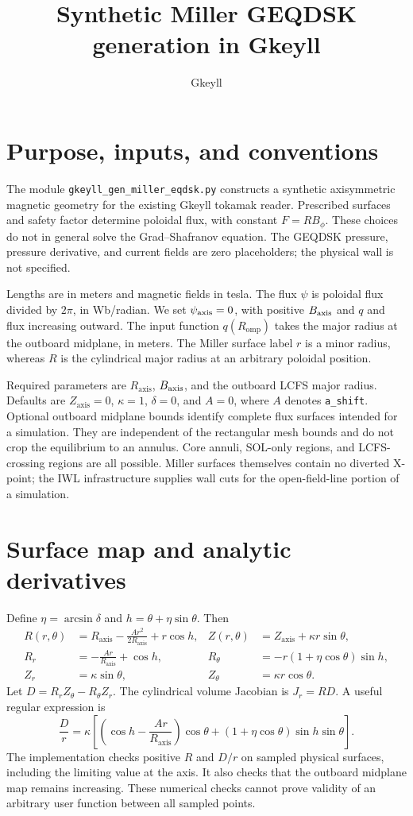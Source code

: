 \documentclass[11pt]{article}
\title{Synthetic Miller GEQDSK generation in Gkeyll}
\author{Gkeyll}
\date{}
\newcommand{\Ra}{R_{\mathrm{axis}}}
\newcommand{\Za}{Z_{\mathrm{axis}}}
\newcommand{\Romp}{R_{\mathrm{omp}}}
\begin{document}
\maketitle

\section{Purpose, inputs, and conventions}
The module \texttt{gkeyll\_gen\_miller\_eqdsk.py} constructs a synthetic
axisymmetric magnetic geometry for the existing Gkeyll tokamak reader.
Prescribed surfaces and safety factor determine poloidal flux, with constant
$F=RB_\phi$. These choices do not in general solve the Grad--Shafranov equation.
The GEQDSK pressure, pressure derivative, and current fields are zero
placeholders; the physical wall is not specified.

Lengths are in meters and magnetic fields in tesla. The flux $\psi$ is poloidal
flux divided by $2\pi$, in Wb/radian. We set $\psi_{\rm axis}=0$, with positive
$B_{\rm axis}$ and $q$ and flux increasing outward. The input function
$q(\Romp)$ takes the major radius at the outboard midplane, in meters.
The Miller surface label $r$ is a minor radius, whereas $R$ is the cylindrical
major radius at an arbitrary poloidal position.

Required parameters are $\Ra$, $B_{\rm axis}$, and the outboard LCFS major
radius. Defaults are $\Za=0$, $\kappa=1$, $\delta=0$, and $A=0$, where
$A$ denotes \texttt{a\_shift}. Optional outboard midplane bounds identify
complete flux surfaces intended for a simulation. They are independent of
the rectangular mesh bounds and do not crop the equilibrium to an annulus.
Core annuli, SOL-only regions, and LCFS-crossing regions are all possible.
Miller surfaces themselves contain no diverted X-point; the IWL infrastructure
supplies wall cuts for the open-field-line portion of a simulation.

\section{Surface map and analytic derivatives}
Define $\eta=\arcsin\delta$ and $h=\theta+\eta\sin\theta$. Then
\begin{align}
R(r,\theta)&=\Ra-\frac{Ar^2}{2\Ra}+r\cos h, &
Z(r,\theta)&=\Za+\kappa r\sin\theta,\\
R_r&=-\frac{Ar}{\Ra}+\cos h, &
R_\theta&=-r(1+\eta\cos\theta)\sin h,\\
Z_r&=\kappa\sin\theta, & Z_\theta&=\kappa r\cos\theta.
\end{align}
Let $D=R_rZ_\theta-R_\theta Z_r$. The cylindrical volume Jacobian is
$J_r=RD$. A useful regular expression is
\begin{equation}
\frac{D}{r}=\kappa\left[
\left(\cos h-\frac{Ar}{\Ra}\right)\cos\theta
+(1+\eta\cos\theta)\sin h\sin\theta\right].
\end{equation}
The implementation checks positive $R$ and $D/r$ on sampled physical surfaces,
including the limiting value at the axis. It also checks that the outboard
midplane map remains increasing. These numerical checks cannot prove validity
of an arbitrary user function between all sampled points.
\end{document}
